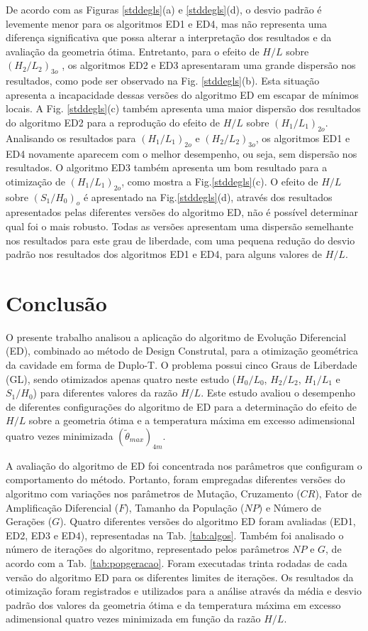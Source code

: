 \documentclass[12pt,A4,A4pt]{article}
\begin{document}
 De acordo com as Figuras \ref{stddegls}(a) e \ref{stddegls}(d), o desvio padrão é levemente menor para os algoritmos ED1 e ED4, mas não representa uma diferença significativa que possa alterar a interpretação dos resultados e da avaliação da geometria ótima. Entretanto, para o efeito de $H/L$ sobre ${(H_{2}/L_{2})_{3o}}$	, os algoritmos ED2 e ED3 apresentaram uma grande dispersão nos resultados, como pode ser observado na Fig. \ref{stddegls}(b). Esta situação apresenta a incapacidade dessas versões do algoritmo ED em escapar de mínimos locais.  A Fig. \ref{stddegls}(c) também apresenta uma maior dispersão dos resultados do algoritmo ED2 para a reprodução do efeito de $H/L$ sobre ${(H_{1}/L_{1})_{2o}}$. Analisando os resultados para  ${(H_{1}/L_{1})_{2o}}$ e ${(H_{2}/L_{2})_{3o}}$, os algoritmos ED1 e ED4 novamente aparecem com o melhor desempenho, ou seja, sem dispersão nos resultados. O algoritmo ED3 também apresenta um bom resultado para a otimização de ${(H_{1}/L_{1})_{2o}}$, como mostra a Fig.\ref{stddegls}(c). O efeito de $H/L$ sobre ${(S_{1}/H_{0})_{o}}$ é apresentado na Fig.\ref{stddegls}(d), através dos resultados apresentados pelas diferentes versões do algoritmo ED, não é possível determinar qual foi o mais robusto. Todas as versões apresentam uma dispersão semelhante nos resultados para este grau de liberdade, com uma pequena redução do desvio padrão nos resultados dos algoritmos ED1 e ED4, para alguns valores de $H/L$.


\section{Conclusão}
\label{opt}
\hspace{0.5cm} O presente trabalho analisou a aplicação do algoritmo de Evolução Diferencial (ED), combinado ao método de Design Construtal, para a otimização geométrica da cavidade em forma de Duplo-T. O problema possui cinco Graus de Liberdade (GL), sendo otimizados apenas quatro neste estudo ($H_{0}/L_{0}$,  $H_{2}/L_{2}$, $H_{1}/L_{1}$ e $S_{1}/H_{0}$) para diferentes valores da razão $H/L$. Este estudo avaliou o desempenho de diferentes configurações do algoritmo de ED para a determinação do efeito de $H/L$ sobre a geometria ótima e a temperatura máxima em excesso adimensional quatro vezes minimizada  $({\tilde{\theta}}_{max})_{4m}$.

A avaliação do algoritmo de ED foi concentrada nos parâmetros que configuram o comportamento do método. Portanto, foram empregadas diferentes versões do algoritmo com variações nos parâmetros de Mutação, Cruzamento ($CR$), Fator de Amplificação Diferencial ($F$), Tamanho da População ($NP$) e Número de Gerações ($G$). Quatro diferentes versões do algoritmo ED foram avaliadas (ED1, ED2, ED3 e ED4), representadas na Tab. \ref{tab:algos}. Também foi analisado o número de iterações do algoritmo, representado pelos parâmetros $NP$ e $G$, de acordo com a Tab. \ref{tab:popgeracao}. Foram executadas trinta rodadas de cada versão do algoritmo ED para os diferentes limites de iterações. Os resultados da otimização foram registrados e utilizados para a análise através da média e desvio padrão dos valores da geometria ótima e da temperatura máxima em excesso adimensional quatro vezes minimizada em função da razão $H/L$.
\end{document}
